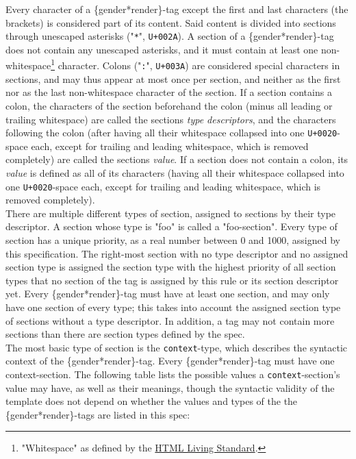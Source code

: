 \documentclass{article}
\begin{document}
    Every character of a \{gender*render\}-tag except the first and last characters (the brackets) is considered part of its content.
    Said content is divided into sections through unescaped asterisks ("\texttt{*}", \texttt{U+002A}).
    A section of a \{gender*render\}-tag does not contain any unescaped asterisks, and it must contain at least one non-whitespace\footnote{"Whitespace" as defined by the \href{https://infra.spec.whatwg.org/\#ascii-whitespace}{HTML Living Standard}.} character.
    Colons ("\texttt{:}", \texttt{U+003A}) are considered special characters in sections, and may thus appear at most once per section, and neither as the first nor as the last non-whitespace  character of the section.
    If a section contains a colon, the characters of the section beforehand the colon (minus all leading or trailing whitespace) are called the sections \emph{type descriptors}, and the characters following the colon (after having all their whitespace collapsed into one \texttt{U+0020}-space each, except for trailing and leading whitespace, which is removed completely) are called the sections \emph{value}.
    If a section does not contain a colon, its \emph{value} is defined as all of its characters (having all their whitespace collapsed into one \texttt{U+0020}-space each, except for trailing and leading whitespace, which is removed completely).\\

    There are multiple different types of section, assigned to sections by their type descriptor.
    A section whose type is "foo" is called a "foo-section".
    Every type of section has a unique priority, as a real number between 0 and 1000, assigned by this specification.
    The right-most section with no type descriptor and no assigned section type is assigned the section type with the highest priority of all section types that no section of the tag is assigned by this rule or its section descriptor yet.
    Every \{gender*render\}-tag must have at least one section, and may only have one section of every type;
    this takes into account the assigned section type of sections without a type descriptor.
    In addition, a tag may not contain more sections than there are section types defined by the spec.\\

    The most basic type of section is the \texttt{context}-type, which describes the syntactic context of the \{gender*render\}-tag.
    Every \{gender*render\}-tag must have one context-section.
    The following table lists the possible values a \texttt{context}-section's value may have, as well as their meanings, though the syntactic validity of the template does not depend on whether the values and types of the the \{gender*render\}-tags are listed in this spec:
\end{document}
